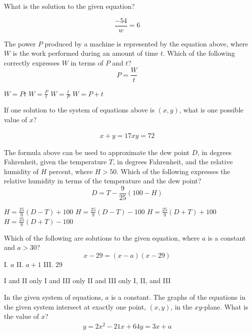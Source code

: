 \newpage

\question[1]
What is the solution to the given equation?

\[
\frac{-54}{w}=6
\]

\begin{solutionorbox}[1in]
\end{solutionorbox}

\question[1]
The power $P$ produced by a machine is represented by the equation above, where $W$ is the work performed during an amount of time $t$. Which of the following correctly expresses $W$ in terms of $P$ and $t$?
\[
P=\frac{W}{t}
\]
\begin{choices}
  \CorrectChoice $W=P t$
  \choice $W=\frac{P}{t}$
  \choice $W=\frac{t}{P}$
  \choice $W=P+t$
\end{choices}

\question[1]
If one solution to the system of equations above is $(x, y)$, what is one possible value of $x$?

\[
\begin{array}{r}
x+y=17 
x y=72
\end{array}
\]

\begin{solutionorbox}[1in]
\end{solutionorbox}

\question[1]
The formula above can be used to approximate the dew point $D$, in degrees Fahrenheit, given the temperature $T$, in degrees Fahrenheit, and the relative humidity of $H$ percent, where $H>50$. Which of the following expresses the relative humidity in terms of the temperature and the dew point?
\[
D=T-\frac{9}{25}(100-H)
\]
\begin{choices}
  \CorrectChoice $H=\frac{25}{9}(D-T)+100$
  \choice $H=\frac{25}{9}(D-T)-100$
  \choice $H=\frac{25}{9}(D+T)+100$
  \choice $H=\frac{25}{9}(D+T)-100$
\end{choices}

\question[1]
Which of the following are solutions to the given equation, where $a$ is a constant and $a>30$?
\[
x-29=(x-a)(x-29)
\]
I. $a$
II. $a+1$
III. 29
\begin{choices}
  \choice I and II only
  \choice I and III only
  \CorrectChoice II and III only
  \choice I, II, and III
\end{choices}

\question[1]
In the given system of equations, $a$ is a constant. The graphs of the equations in the given system intersect at exactly one point, $(x, y)$, in the $x y$-plane. What is the value of $x$?
\[
\begin{gathered}
y=2 x^{2}-21 x+64 
y=3 x+a
\end{gathered}
\]
\begin{choices}
\end{choices}

